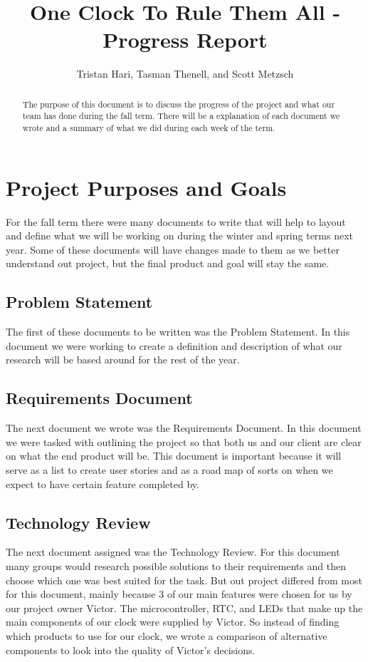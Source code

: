 \documentclass[10pt,draftclsnofoot,onecolumn]{IEEEtran}
\begin{document}
\title{One Clock To Rule Them All - Progress Report}
\author{Tristan Hari, Tasman Thenell, and Scott Metzsch}
\maketitle
\begin{abstract}
The purpose of this document is to discuss the progress of the project and what our team has done during the fall term.
There will be a explanation of each document we wrote and a summary of what we did during each week of the term.
\end{abstract}

\newpage

\section{Project Purposes and Goals}
For the fall term there were many documents to write that will help to layout and define what we will be working on during the winter and spring terms next year.
Some of these documents will have changes made to them as we better understand out project, but the final product and goal will stay the same. 
\subsection{Problem Statement}
The first of these documents to be written was the Problem Statement. 
In this document we were working to create a definition and description of what our research will be based around for the rest of the year. 
\subsection{Requirements Document}
The next document we wrote was the Requirements Document.
In this document we were tasked with outlining the project so that both us and our client are clear on what the end product will be.
This document is important because it will serve as a list to create user stories and as a road map of sorts on when we expect to have certain feature completed by. 
\subsection{Technology Review}
The next document assigned was the Technology Review. 
For this document many groups would research possible solutions to their requirements and then choose which one was best suited for the task. 
But out project differed from most for this document, mainly because 3 of our main features were chosen for us by our project owner Victor.
The microcontroller, RTC, and LEDs that make up the main components of our clock were supplied by Victor.
So instead of finding which products to use for our clock, we wrote a comparison of alternative components to look into the quality of Victor's decisions. 
\end{document}
